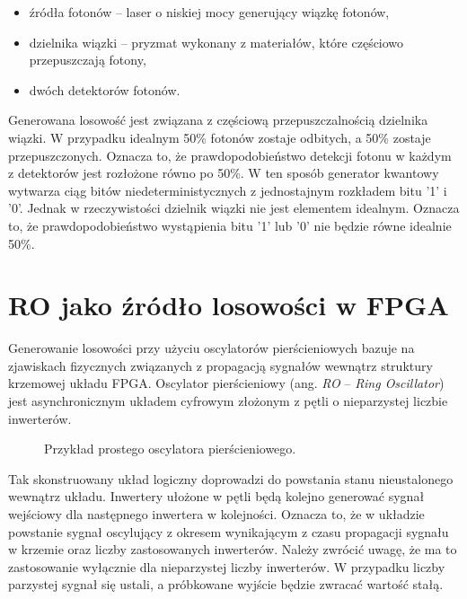 \begin{itemize}
    \item źródła fotonów -- laser o niskiej mocy generujący wiązkę fotonów,
    \item dzielnika wiązki -- pryzmat wykonany z materiałów, które częściowo 
    przepuszczają fotony,
    \item dwóch detektorów fotonów.
\end{itemize}

Generowana losowość jest związana z częściową przepuszczalnością dzielnika 
wiązki. W przypadku idealnym 50\% fotonów zostaje odbitych, a 50\% zostaje 
przepuszczonych. Oznacza to, że prawdopodobieństwo detekcji fotonu w każdym 
z detektorów jest rozłożone równo po 50\%. W ten sposób generator kwantowy 
wytwarza ciąg bitów niedeterministycznych z jednostajnym rozkładem bitu '1' i '0'.
Jednak w rzeczywistości dzielnik wiązki nie jest elementem idealnym. Oznacza 
to, że prawdopodobieństwo wystąpienia bitu '1' lub '0' nie będzie równe idealnie 50\%. 

\section{RO jako źródło losowości w FPGA}

\noindent Generowanie losowości przy użyciu oscylatorów pierścieniowych bazuje 
na zjawiskach fizycznych związanych z propagacją sygnałów wewnątrz 
struktury krzemowej układu FPGA. Oscylator pierścieniowy 
(ang. \textit{RO} -- \textit{Ring Oscillator}) jest asynchronicznym układem cyfrowym złożonym z 
pętli o nieparzystej liczbie inwerterów. 

\begin{figure}[H]
    \centering
    
    \caption{Przykład prostego oscylatora pierścieniowego.}
    \label{fig:ch2_oscylator_3xNOT}
\end{figure}

Tak skonstruowany układ logiczny doprowadzi do powstania stanu nieustalonego 
wewnątrz układu. Inwertery ułożone w pętli będą kolejno generować sygnał 
wejściowy dla następnego inwertera w kolejności. Oznacza to, że w układzie 
powstanie sygnał oscylujący z okresem wynikającym z czasu propagacji sygnału 
w krzemie oraz liczby zastosowanych inwerterów. Należy zwrócić uwagę, że ma 
to zastosowanie wyłącznie dla nieparzystej liczby inwerterów. W przypadku liczby 
parzystej sygnał się ustali, a próbkowane wyjście będzie zwracać wartość stałą.

